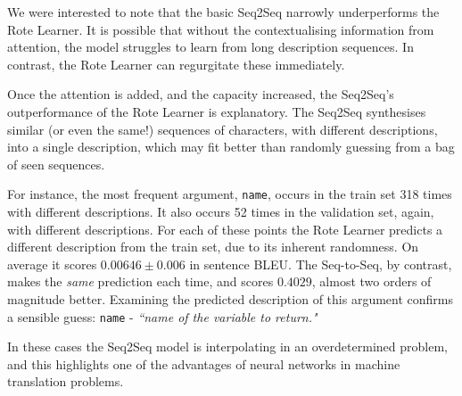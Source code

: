 We were interested to note that the basic Seq2Seq narrowly underperforms the Rote Learner. 
It is possible that without the contextualising information from attention, the model struggles to learn from long description sequences. In contrast, the Rote Learner can regurgitate these immediately. 

Once the attention is added, and the capacity increased, the Seq2Seq's outperformance of the Rote Learner is explanatory.
The Seq2Seq synthesises similar (or even the same!) sequences of characters, with different descriptions, into a single description, which may fit better than randomly guessing from a bag of seen sequences. 

For instance, the most frequent argument, \texttt{name}, occurs in the train set 318 times with different descriptions. 
It also occurs 52 times in the validation set, again, with different descriptions. 
For each of these points the Rote Learner predicts a different description from the train set, due to its inherent randomness. On average it scores $0.00646 \pm 0.006$ in sentence BLEU. The Seq-to-Seq, by contrast, makes the \textit{same} prediction each time, and scores $0.4029$, almost two orders of magnitude better. Examining the predicted description of this argument confirms a sensible guess: \texttt{name} - \textit{``name of the variable to return."} 

In these cases the Seq2Seq model is interpolating in an overdetermined problem, and this highlights one of the advantages of neural networks in machine translation problems. 

